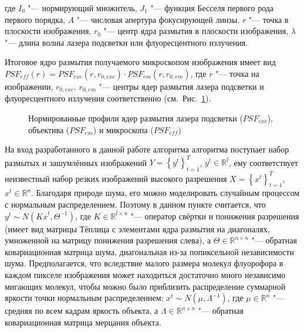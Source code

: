 \noindent где $I_0$ "--- нормирующий множитель, $J_1$ "--- функция Бесселя первого рода первого порядка, $A$ "--- числовая апертура фокусирующей линзы, $r$ "--- точка в плоскости изображения, $r_0$ "--- центр ядра размытия в плоскости изображения, $\lambda$ "--- длина волны лазера подсветки или флуоресцентного излучения.

Итоговое ядро размытия получаемого микроскопом изображения имеет вид $PSF_{eff}\left(r\right)=PSF_{exc}\left(r,r_{0,exc}\right)\cdot PSF_{em}\left(r,r_{0,em}\right)$, где $r$ "--- точка на изображении, $r_{0,exc}$, $r_{0,em}$ "--- центры ядер размытия лазера подсветки и флуоресцентного излучения соответственно (см.~Рис.~\ref{fig:sinopsis-blinking-psf}).

\begin{figure}[ht]
	\caption{Нормированные профили ядер размытия лазера подсветки ($PSF_{exc}$), объектива ($PSF_{em}$) и микроскопа ($PSF_{eff}$)}
	\label{fig:sinopsis-blinking-psf}
\end{figure}


На вход разработанного в данной работе алгоритма алгоритма поступает набор размытых и зашумлённых изображений $Y=\left\{y^t\right\}_{t=1}^T$, $y^t\in\mathbb{R}^l$, ему соответствует неизвестный набор резких изображений высокого разрешения $X=\left\{x^t\right\}_{t=1}^T$, $x^t\in\mathbb{R}^n$. Благодаря природе шума, его можно моделировать случайным процессом с нормальным распределением.
Поэтому в данном пункте считается, что $y^t \sim N({Kx}^t,\Theta^{-1})$, где $K\in\mathbb{R}^{l \times n}$ "--- оператор свёртки и понижения разрешения (имеет вид матрицы Тёплица с элементами ядра размытия на диагоналях, умноженной на матрицу понижения разрешения слева), а $\Theta\in\mathbb{R}^{n \times n}$ "--- обратная ковариационная матрица шума, диагональная из-за попиксельной независимости шума. Предполагается, что вследствие малого размера молекул флуорофора в каждом пикселе изображения может находиться достаточно много независимо мигающих молекул, чтобы можно было приблизить распределение суммарной яркости точки нормальным распределением: $x^t \sim N(\mu,\Lambda^{-1})$, где $\mu\in\mathbb{R}^n$ "--- средняя по всем кадрам яркость объекта, а $\Lambda\in\mathbb{R}^{n \times n}$ "--- обратная ковариационная матрица мерцания объекта.

